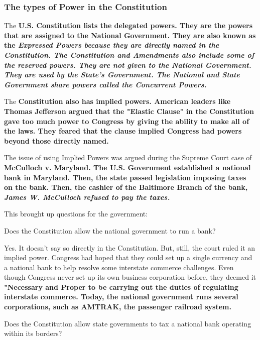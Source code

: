 
\subsubsection*{The types of Power in the Constitution}

The \bf{U.S. Constitution} lists the delegated powers. They are the powers that are assigned to the \bf{National Government}. They are also known as the \it{Expressed Powers} because they are directly named in the Constitution. The Constitution and Amendments also include some of the reserved powers. They are not given to the National Government. They are used by the State's Government. The National and State Government share powers called the \bf{Concurrent Powers}.

The \bf{Constitution} also has implied powers. American leaders like Thomas Jefferson argued that the \bf{"Elastic Clause"} in the Constitution gave too much power to Congress by giving the ability to make all of the laws. They feared that the clause implied Congress had powers beyond those directly named.

The issue of using Implied Powers was argued during the Supreme Court case of \bf{McCulloch v. Maryland}. The U.S. Government established a national bank in \bf{Maryland}. Then, the state passed legislation imposing taxes on the bank. Then, the cashier of the Baltimore Branch of the bank, \it{James W. McCulloch} refused to pay the taxes.

This brought up questions for the government:

\begin{question}
    Does the Constitution allow the national government to run a bank?
\end{question}

\begin{answer}
    Yes. It doesn't say so directly in the Constitution. But, still, the court ruled it an implied power. Congress had hoped that they could set up a single currency and a national bank to help resolve some interstate commerce challenges. Even though Congress never set up its own business corporation before, they deemed it \bf{"Necessary and Proper} to be carrying out the duties of regulating interstate commerce. Today, the national government runs several corporations, such as AMTRAK, the passenger railroad system.
\end{answer}

\begin{question}
    Does the Constitution allow state governments to tax a national bank operating within its borders?
\end{question}

